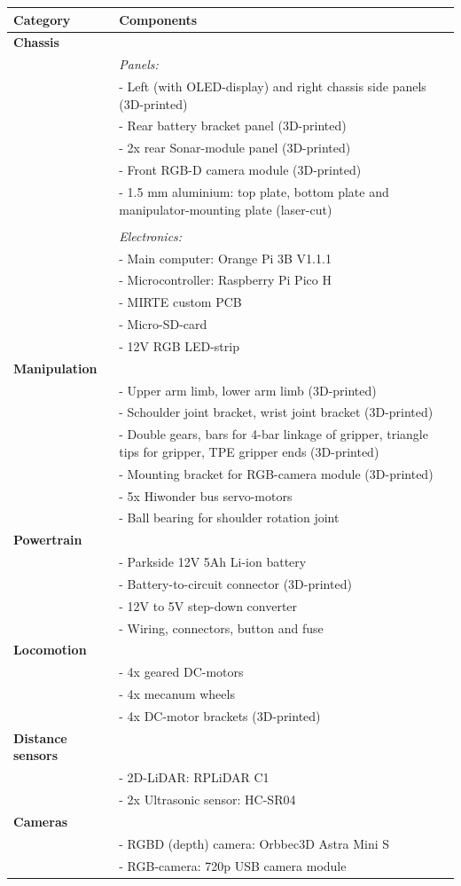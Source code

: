 \bigskip\noindent
\begin{tabular}{p{}p{}}
\toprule
Category & Components \\
\hline
\textbf{Chassis} &  \\
 & \textit{Panels:} \\
 & - Left (with OLED-display) and right chassis side panels (3D-printed) \\
 & - Rear battery bracket panel (3D-printed) \\
 & - 2x rear Sonar-module panel (3D-printed) \\
 & - Front RGB-D camera module (3D-printed) \\
 & - 1.5 mm aluminium: top plate, bottom plate and manipulator-mounting plate (laser-cut) \\
 &  \\
 & \textit{Electronics:} \\
 & - Main computer: Orange Pi 3B V1.1.1 \\
 & - Microcontroller: Raspberry Pi Pico H \\
 & - MIRTE custom PCB \\
 & - Micro-SD-card \\
 & - 12V RGB LED-strip \\
\textbf{Manipulation} &  \\
 & - Upper arm limb, lower arm limb (3D-printed) \\
 & - Schoulder joint bracket, wrist joint bracket (3D-printed) \\
 & - Double gears, bars for 4-bar linkage of gripper, triangle tips for gripper, TPE gripper ends (3D-printed) \\
 & - Mounting bracket for RGB-camera module (3D-printed) \\
 & - 5x Hiwonder bus servo-motors \\
 & - Ball bearing for shoulder rotation joint \\
\textbf{Powertrain} &  \\
 & - Parkside 12V 5Ah Li-ion battery \\
 & - Battery-to-circuit connector (3D-printed) \\
 & - 12V to 5V step-down converter \\
 & - Wiring, connectors, button and fuse \\
\textbf{Locomotion} &  \\
 & - 4x geared DC-motors \\
 & - 4x mecanum wheels \\
 & - 4x DC-motor brackets (3D-printed) \\
\textbf{Distance sensors} &  \\
 & - 2D-LiDAR: RPLiDAR C1 \\
 & - 2x Ultrasonic sensor: HC-SR04 \\
\textbf{Cameras} &  \\
 & - RGBD (depth) camera: Orbbec3D Astra Mini S \\
 & - RGB-camera: 720p USB camera module \\
\bottomrule
\end{tabular}

